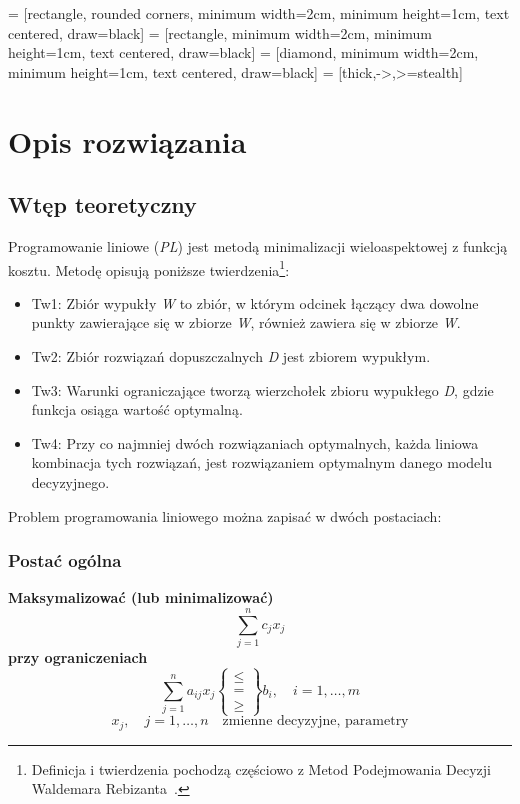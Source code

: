 \usetikzlibrary{shapes, arrows}
\usetikzlibrary{positioning}
\usetikzlibrary{shapes.geometric, arrows, positioning}
\usetikzlibrary{intersections, patterns, calc}

 = [rectangle, rounded corners, minimum width=2cm, minimum height=1cm, text centered, draw=black]
 = [rectangle, minimum width=2cm, minimum height=1cm, text centered, draw=black]
 = [diamond, minimum width=2cm, minimum height=1cm, text centered, draw=black]
 = [thick,->,>=stealth]

\chapter{Opis rozwiązania}

\section{Wtęp teoretyczny}

Programowanie liniowe (\textit{PL}) jest metodą minimalizacji wieloaspektowej z funkcją kosztu. Metodę opisują poniższe twierdzenia\footnote{Definicja i twierdzenia pochodzą częściowo z Metod Podejmowania Decyzji Waldemara Rebizanta~\cite{rebizant2012metody}.}:
\begin{itemize}
\item Tw1: Zbiór wypukły \textit{W} to zbiór, w którym odcinek łączący dwa dowolne punkty zawierające się w zbiorze \textit{W}, również zawiera się w zbiorze \textit{W}.

\item Tw2: Zbiór rozwiązań dopuszczalnych \textit{D} jest zbiorem wypukłym.

\item Tw3: Warunki ograniczające tworzą wierzchołek zbioru wypukłego \textit{D}, gdzie funkcja osiąga wartość optymalną.

\item Tw4: Przy co najmniej dwóch rozwiązaniach optymalnych, każda liniowa kombinacja tych rozwiązań, jest rozwiązaniem optymalnym danego modelu decyzyjnego.
\end{itemize}
Problem programowania liniowego można zapisać w dwóch postaciach:

\subsection{Postać ogólna}
    
    \noindent
    \textbf{Maksymalizować (lub minimalizować)}
    \[
    \sum_{j=1}^{n} c_j x_j
    \]
    \textbf{przy ograniczeniach}
    \[
    \sum_{j=1}^{n} a_{ij} x_j \left\{
    \begin{array}{l}
    \leq \\
    = \\
    \geq
    \end{array} \right\} b_i, \quad i = 1, \dots, m
    \]
    \[
    x_j, \quad j = 1, \dots, n \quad \text{zmienne decyzyjne, parametry}
    \]

